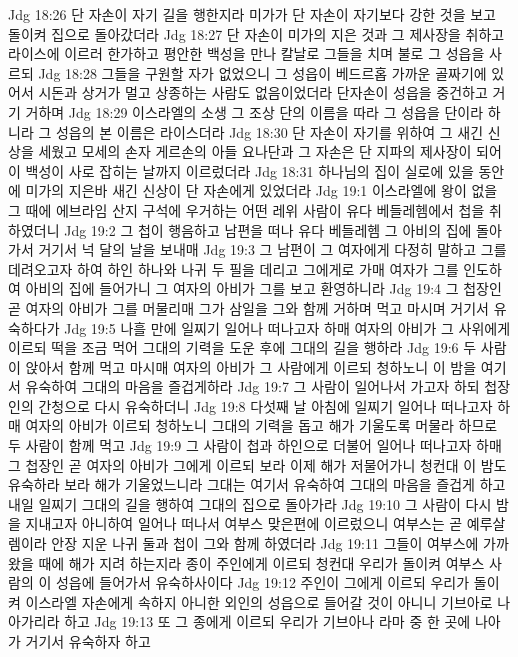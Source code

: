 Jdg 18:26  단 자손이 자기 길을 행한지라 미가가 단 자손이 자기보다 강한 것을 보고 돌이켜 집으로 돌아갔더라
Jdg 18:27  단 자손이 미가의 지은 것과 그 제사장을 취하고 라이스에 이르러 한가하고 평안한 백성을 만나 칼날로 그들을 치며 불로 그 성읍을 사르되
Jdg 18:28  그들을 구원할 자가 없었으니 그 성읍이 베드르홉 가까운 골짜기에 있어서 시돈과 상거가 멀고 상종하는 사람도 없음이었더라 단자손이 성읍을 중건하고 거기 거하며
Jdg 18:29  이스라엘의 소생 그 조상 단의 이름을 따라 그 성읍을 단이라 하니라 그 성읍의 본 이름은 라이스더라
Jdg 18:30  단 자손이 자기를 위하여 그 새긴 신상을 세웠고 모세의 손자 게르손의 아들 요나단과 그 자손은 단 지파의 제사장이 되어 이 백성이 사로 잡히는 날까지 이르렀더라
Jdg 18:31  하나님의 집이 실로에 있을 동안에 미가의 지은바 새긴 신상이 단 자손에게 있었더라
Jdg 19:1  이스라엘에 왕이 없을 그 때에 에브라임 산지 구석에 우거하는 어떤 레위 사람이 유다 베들레헴에서 첩을 취하였더니
Jdg 19:2  그 첩이 행음하고 남편을 떠나 유다 베들레헴 그 아비의 집에 돌아가서 거기서 넉 달의 날을 보내매
Jdg 19:3  그 남편이 그 여자에게 다정히 말하고 그를 데려오고자 하여 하인 하나와 나귀 두 필을 데리고 그에게로 가매 여자가 그를 인도하여 아비의 집에 들어가니 그 여자의 아비가 그를 보고 환영하니라
Jdg 19:4  그 첩장인 곧 여자의 아비가 그를 머물리매 그가 삼일을 그와 함께 거하며 먹고 마시며 거기서 유숙하다가
Jdg 19:5  나흘 만에 일찌기 일어나 떠나고자 하매 여자의 아비가 그 사위에게 이르되 떡을 조금 먹어 그대의 기력을 도운 후에 그대의 길을 행하라
Jdg 19:6  두 사람이 앉아서 함께 먹고 마시매 여자의 아비가 그 사람에게 이르되 청하노니 이 밤을 여기서 유숙하여 그대의 마음을 즐겁게하라
Jdg 19:7  그 사람이 일어나서 가고자 하되 첩장인의 간청으로 다시 유숙하더니
Jdg 19:8  다섯째 날 아침에 일찌기 일어나 떠나고자 하매 여자의 아비가 이르되 청하노니 그대의 기력을 돕고 해가 기울도록 머물라 하므로 두 사람이 함께 먹고
Jdg 19:9  그 사람이 첩과 하인으로 더불어 일어나 떠나고자 하매 그 첩장인 곧 여자의 아비가 그에게 이르되 보라 이제 해가 저물어가니 청컨대 이 밤도 유숙하라 보라 해가 기울었느니라 그대는 여기서 유숙하여 그대의 마음을 즐겁게 하고 내일 일찌기 그대의 길을 행하여 그대의 집으로 돌아가라
Jdg 19:10  그 사람이 다시 밤을 지내고자 아니하여 일어나 떠나서 여부스 맞은편에 이르렀으니 여부스는 곧 예루살렘이라 안장 지운 나귀 둘과 첩이 그와 함께 하였더라
Jdg 19:11  그들이 여부스에 가까왔을 때에 해가 지려 하는지라 종이 주인에게 이르되 청컨대 우리가 돌이켜 여부스 사람의 이 성읍에 들어가서 유숙하사이다
Jdg 19:12  주인이 그에게 이르되 우리가 돌이켜 이스라엘 자손에게 속하지 아니한 외인의 성읍으로 들어갈 것이 아니니 기브아로 나아가리라 하고
Jdg 19:13  또 그 종에게 이르되 우리가 기브아나 라마 중 한 곳에 나아가 거기서 유숙하자 하고
